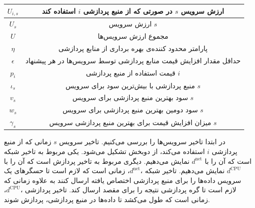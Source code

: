 \begin{table}[h]
\begin{tabularx}{\textwidth}{|c|C|}
        $U_{i,s}$           & ارزش سرویس $s$ در صورتی که از منبع پردازشی $i$ استفاده کند                                 \\ \hline
        $U_s$               & ارزش سرویس $s$                                                                             \\ \hline
        $U$                 & مجموع ارزش سرویس‌ها                                                                         \\ \hline
        $\eta$              & پارامتر محدود کننده‌ی بهره برداری از منابع پردازشی                                          \\ \hline
        $\epsilon$          & حداقل مقدار افزایش قیمت منابع پردازشی توسط سرویس‌ها در هر پیشنهاد                           \\ \hline
        $p_i$               & قیمت استفاده از منبع پردازشی $i$                                                           \\ \hline
        $\iota_s$           & منبع پردازشی با بیش‌ترین سود برای سرویس $s$                                                 \\ \hline
        $v_s$               & سود بهترین منبع پردازشی برای سرویس $s$                                                     \\ \hline
        $w_s$               & سود دومین بهترین منبع پردازشی برای سرویس $s$                                               \\ \hline
        $\gamma_s$          & میزان افزایش قیمت برای بهترین منبع پردازشی سرویس $s$                                       \\ \hline
      \end{tabularx}
      \label{tbl:one_to_one:notation}
    \end{table}

    در ابتدا تاخیر سرویس‌ها را بررسی می‌کنیم.
    تاخیر سرویس $s$ زمانی که از منبع پردازشی $i$ استفاده می‌کند، از دوبخش تشکیل می‌شود.
    یکی مربوط به تاخیر شبکه‌ است که آن را با $d^\text{net}$ نمایش می‌دهیم.
    دیگری مربوط به تاخیر پردازش است که آن را با $d^\text{CPU}$ نمایش می‌دهیم.
    تاخیر شبکه ،$d^\text{net}$، زمانی است که لازم است تا حسگر‌‌های یک سرویس داده‌ها را برای منبع پردازشی اختصاص یافته ارسال کنند به علاوه زمانی که لازم است تا گره پردازشی نتیجه را برای مقصد ارسال کند.
    تاخیر پردازشی ،$d^\text{CPU}$، زمانی است که طول می‌کشد تا داده‌ها در منبع پردازشی، پردازش شوند.
    
